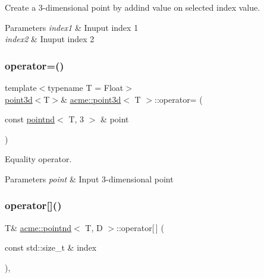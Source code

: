 Create a 3-\/dimensional point by addind value on selected index value. 


\begin{DoxyParams}{Parameters}
{\em index1} & Inuput index 1 \\
\hline
{\em index2} & Inuput index 2 \\
\hline
\end{DoxyParams}
\mbox{\label{classacme_1_1point3d_ae4d80a128a282ef6b98560c5932abe13}} 
\subsubsection{\texorpdfstring{operator=()}{operator=()}}
{\footnotesize\ttfamily template$<$typename T = Float$>$ \\
\hyperlink{classacme_1_1point3d}{point3d}$<$T$>$\& \hyperlink{classacme_1_1point3d}{acme\+::point3d}$<$ T $>$\+::operator= (\begin{DoxyParamCaption}\item[{const \hyperlink{classacme_1_1pointnd}{pointnd}$<$ T, 3 $>$ \&}]{point }\end{DoxyParamCaption})\hspace{0.3cm}{\ttfamily [inline]}}



Equality operator. 


\begin{DoxyParams}{Parameters}
{\em point} & Input 3-\/dimensional point \\
\hline
\end{DoxyParams}
\mbox{\label{classacme_1_1pointnd_a35b0691673728d98d455c007612d6b91}} 
\subsubsection{\texorpdfstring{operator[]()}{operator[]()}\hspace{0.1cm}{\footnotesize\ttfamily [1/2]}}
{\footnotesize\ttfamily T\& \hyperlink{classacme_1_1pointnd}{acme\+::pointnd}$<$ T, D $>$\+::operator\mbox{[}$\,$\mbox{]} (\begin{DoxyParamCaption}\item[{const std\+::size\+\_\+t \&}]{index }\end{DoxyParamCaption})\hspace{0.3cm}{\ttfamily [inline]}, {\ttfamily [inherited]}}




